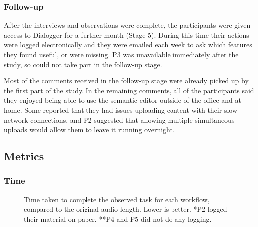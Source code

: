 
\subsubsection{Follow-up}\label{sec:followup}
After the interviews and observations were complete, the participants were given access to Dialogger for a further
month (Stage 5). During this time their actions were logged electronically and they were emailed each week to ask which
features they found useful, or were missing. P3 was unavailable immediately after the study, so could not take part in
the follow-up stage.

Most of the comments received in the follow-up stage were already picked up by the first part of the study. In the
remaining comments, all of the participants said they enjoyed being able to use the semantic editor outside of the
office and at home. Some reported that they had issues uploading content with their slow network connections, and P2
suggested that allowing multiple simultaneous uploads would allow them to leave it running overnight.


\subsection{Metrics}\label{sec:screen-results-metrics}
\subsubsection{Time}

\begin{figure}
\centering
	\caption{Time taken to complete the observed task for each workflow, compared
    to the original audio length. Lower is better. *P2 logged their material on
    paper. **P4 and P5 did not do any logging.}
  \label{fig:time}
\end{figure}

